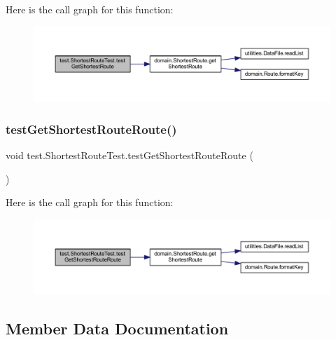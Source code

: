 Here is the call graph for this function\+:\nopagebreak
\begin{figure}[H]
\begin{center}
\leavevmode
\includegraphics[width=350pt]{classtest_1_1_shortest_route_test_a2471bd1b489d85e9430575247c9b2231_cgraph}
\end{center}
\end{figure}
\mbox{\label{classtest_1_1_shortest_route_test_af62280c4503b597b7f9a5ed11b163677}} 
\subsubsection{\texorpdfstring{test\+Get\+Shortest\+Route\+Route()}{testGetShortestRouteRoute()}}
{\footnotesize\ttfamily void test.\+Shortest\+Route\+Test.\+test\+Get\+Shortest\+Route\+Route (\begin{DoxyParamCaption}{ }\end{DoxyParamCaption})}

Here is the call graph for this function\+:\nopagebreak
\begin{figure}[H]
\begin{center}
\leavevmode
\includegraphics[width=350pt]{classtest_1_1_shortest_route_test_af62280c4503b597b7f9a5ed11b163677_cgraph}
\end{center}
\end{figure}


\subsection{Member Data Documentation}
\mbox{\label{classtest_1_1_shortest_route_test_af8d3f3424aff469b335ca4a4f67517c1}} 

